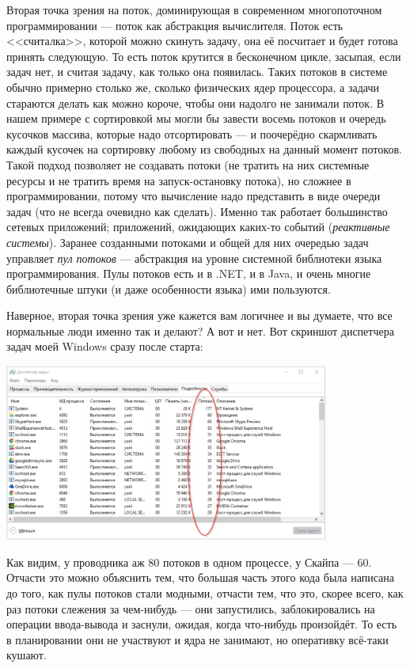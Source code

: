 \documentclass{../../text-style}
\begin{document}
Вторая точка зрения на поток, доминирующая в современном многопоточном программировании --- поток как абстракция вычислителя. Поток есть <<считалка>>, которой можно скинуть задачу, она её посчитает и будет готова принять следующую. То есть поток крутится в бесконечном цикле, засыпая, если задач нет, и считая задачу, как только она появилась. Таких потоков в системе обычно примерно столько же, сколько физических ядер процессора, а задачи стараются делать как можно короче, чтобы они надолго не занимали поток. В нашем примере с сортировкой мы могли бы завести восемь потоков и очередь кусочков массива, которые надо отсортировать --- и поочерёдно скармливать каждый кусочек на сортировку любому из свободных на данный момент потоков. Такой подход позволяет не создавать потоки (не тратить на них системные ресурсы и не тратить время на запуск-остановку потока), но сложнее в программировании, потому что вычисление надо представить в виде очереди задач (что не всегда очевидно как сделать). Именно так работает большинство сетевых приложений; приложений, ожидающих каких-то событий (\textit{реактивные системы}). Заранее созданными потоками и общей для них очередью задач управляет \textit{пул потоков} --- абстракция на уровне системной библиотеки языка программирования. Пулы потоков есть и в .NET, и в Java, и очень многие библиотечные штуки (и даже особенности языка) ими пользуются.

Наверное, вторая точка зрения уже кажется вам логичнее и вы думаете, что все нормальные люди именно так и делают? А вот и нет. Вот скриншот диспетчера задач моей Windows сразу после старта:

\begin{center}
    \includegraphics[width=0.8\textwidth]{threadsEverywhere.png}
\end{center}

Как видим, у проводника аж 80 потоков в одном процессе, у Скайпа --- 60. Отчасти это можно объяснить тем, что большая часть этого кода была написана до того, как пулы потоков стали модными, отчасти тем, что это, скорее всего, как раз потоки слежения за чем-нибудь --- они запустились, заблокировались на операции ввода-вывода и заснули, ожидая, когда что-нибудь произойдёт. То есть в планировании они не участвуют и ядра не занимают, но оперативку всё-таки кушают.
\end{document}
